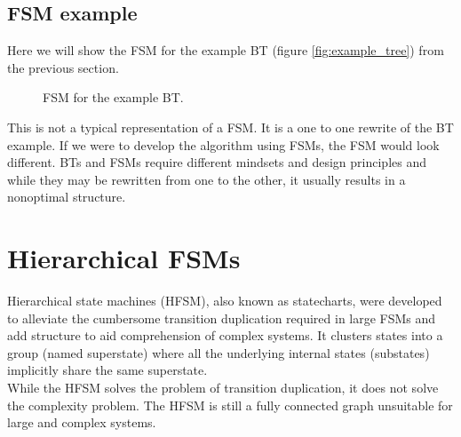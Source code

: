     \subsection{FSM example}
        Here we will show the FSM for the example BT (figure \ref{fig:example_tree}) from the previous section.
        \begin{figure}[H]
            \caption{FSM for the example BT.}
            \label{fig:example_fsm}
        \end{figure}
        This is not a typical representation of a FSM. It is a one to one rewrite of the BT example. If we were to develop the algorithm using FSMs, the FSM would look different. BTs and FSMs require different mindsets and design principles and while they may be rewritten from one to the other, it usually results in a nonoptimal structure.

\section{Hierarchical FSMs}
    Hierarchical state machines (HFSM), also known as statecharts, were developed to alleviate the cumbersome transition duplication required in large FSMs and add structure to aid comprehension of complex systems. It clusters states into a group (named superstate) where all the underlying internal states (substates) implicitly share the same superstate.\cite{BT_driving}\\
    While the HFSM solves the problem of transition duplication, it does not solve the complexity problem. The HFSM is still a fully connected graph unsuitable for large and complex systems.